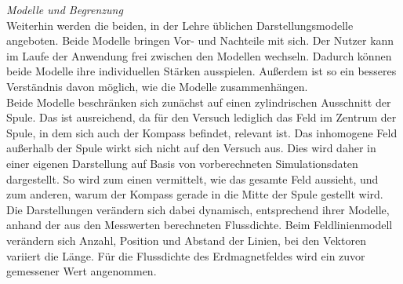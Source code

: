 \textit{Modelle und Begrenzung}\\
Weiterhin werden die beiden, in der Lehre üblichen Darstellungsmodelle angeboten. Beide Modelle bringen Vor- und Nachteile mit sich. Der Nutzer kann im Laufe der Anwendung frei zwischen den Modellen wechseln. Dadurch können beide Modelle ihre individuellen Stärken ausspielen. Außerdem ist so ein besseres Verständnis davon möglich, wie die Modelle zusammenhängen.\\

Beide Modelle beschränken sich zunächst auf einen zylindrischen Ausschnitt der Spule. Das ist ausreichend, da für den Versuch lediglich das Feld im Zentrum der Spule, in dem sich auch der Kompass befindet, relevant ist. Das inhomogene Feld außerhalb der Spule wirkt sich nicht auf den Versuch aus. Dies wird daher in einer eigenen Darstellung auf Basis von vorberechneten Simulationsdaten dargestellt. So wird zum einen vermittelt, wie das gesamte Feld aussieht, und zum anderen, warum der Kompass gerade in die Mitte der Spule gestellt wird.\\

Die Darstellungen verändern sich dabei dynamisch, entsprechend ihrer Modelle, anhand der aus den Messwerten berechneten Flussdichte. Beim Feldlinienmodell verändern sich Anzahl, Position und Abstand der Linien, bei den Vektoren variiert die Länge. Für die Flussdichte des Erdmagnetfeldes wird ein zuvor gemessener Wert angenommen.\\

